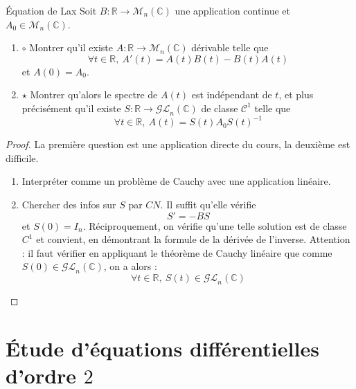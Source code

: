 \documentclass[french,a4paper]{article}
\newcommand{\R}{\mathbb{R}}
\newcommand{\C}{\mathbb{C}}
\newcommand{\inv}{^{-1}}
\theoremstyle{plain}
\theoremstyle{definition}
\theoremstyle{remark}
\begin{document}
\begin{ex}[Moulin.39]{Équation de Lax}
	Soit $B:\R\to\mathcal{M}_n(\C)$ une application continue et $A_0\in\mathcal{M}_n(\C)$. 
	\begin{enumerate}
		\item $\circ$ Montrer qu'il existe $A:\R\to\mathcal{M}_n(\C)$ dérivable telle que $$\forall t\in\R,\ A'(t)=A(t)B(t)-B(t)A(t)$$ et $A(0)=A_0$.
		\item $\star$ Montrer qu'alors le spectre de $A(t)$ est indépendant de $t$, et plus précisément qu'il existe $S:\R\to\mathcal{GL}_n(\C)$ de classe $\mathcal{C}^1$ telle que $$\forall t\in\R,\ A(t)=S(t)A_0S(t)\inv$$
	\end{enumerate}
\end{ex}
\begin{proof}
	La première question est une application directe du cours, la deuxième est difficile.
	\begin{enumerate}
		\item Interpréter comme un problème de Cauchy avec une application linéaire.
		\item Chercher des infos sur $S$ par $CN$. Il suffit qu'elle vérifie $$S'=-BS$$ et $S(0)=I_n$. Réciproquement, on vérifie qu'une telle solution est de classe $C^1$ et convient, en démontrant la formule de la dérivée de l'inverse. Attention : il faut vérifier en appliquant le théorème de Cauchy linéaire que comme $S(0)\in\mathcal{GL}_n(\C)$, on a alors : $$\forall t\in\R,\ S(t)\in\mathcal{GL}_n(\C)$$
	\end{enumerate}
\end{proof}

\section{Étude d'équations différentielles d'ordre $2$}
\end{document}
